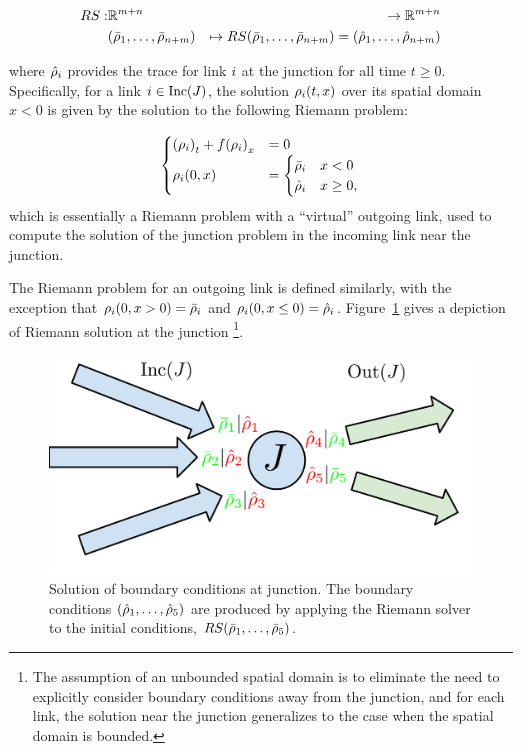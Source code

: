 \begin{eqnarray*}
\RS: & \mathbb{R}^{m+n} & \rightarrow\mathbb{R}^{m+n}\\
 & \tuple{\initstate_{1}}{\initstate_{\ninc+\nout}} & \mapsto\RS\tuple{\initstate_{1}}{\initstate_{\ninc+\nout}}=\tuple{\trace{\cvar}_{1}}{\trace{\cvar}_{\ninc+\nout}}
\end{eqnarray*}


where $\hat{\rho}_{i}$ provides the trace for link $i$
at the junction for all time $t\ge0$. Specifically, for a link $i\in\Inc\left(\jn\right)$,
the solution $\cvar_{i}\left(t,x\right)$ over its spatial domain
$x<0$ is given by the solution to the following Riemann problem:

\begin{equation}
\begin{cases}
\left(\cvar_{\link}\right)_{t}+f\left(\cvar_{\link}\right)_{x} & =0\\
\cvar_{\link}\left(0,x\right) & =\begin{cases}
\initstate_{\link} & x<0\\
\trace{\cvar}_{\link} & x\ge0,
\end{cases}
\end{cases}\label{eq:riemann-problem}
\end{equation}
which is essentially a Riemann problem with a ``virtual'' outgoing
link, used to compute the solution of the junction problem in the
incoming link near the junction.

The Riemann problem for an outgoing link is defined similarly, with
the exception that $\cvar_{\link}\left(0,x>0\right)=\initstate_{\link}$
and $\cvar_{\link}\left(0,x\le0\right)=\trace{\cvar}_{\link}$. Figure~\ref{fig:Solution-of-boundary}
gives a depiction of Riemann solution at the junction%
\footnote{The assumption of an unbounded spatial domain is to eliminate the
need to explicitly consider boundary conditions away from the junction,
and for each link, the solution near the junction generalizes to the
case when the spatial domain is bounded.%
}. 
\begin{figure}
\begin{centering}
\includegraphics[width=0.5\columnwidth]{presentation/figs-gen/junctions-riemann-rs} 
\par\end{centering}

\caption{Solution of boundary conditions at junction. The boundary conditions
$\tuple{\trace{\cvar}_{1}}{\trace{\cvar}_{5}}$ are produced by applying
the Riemann solver to the initial conditions, $\RS\tuple{\initstate_{1}}{\initstate_{5}}$.\label{fig:Solution-of-boundary}}
\end{figure}


